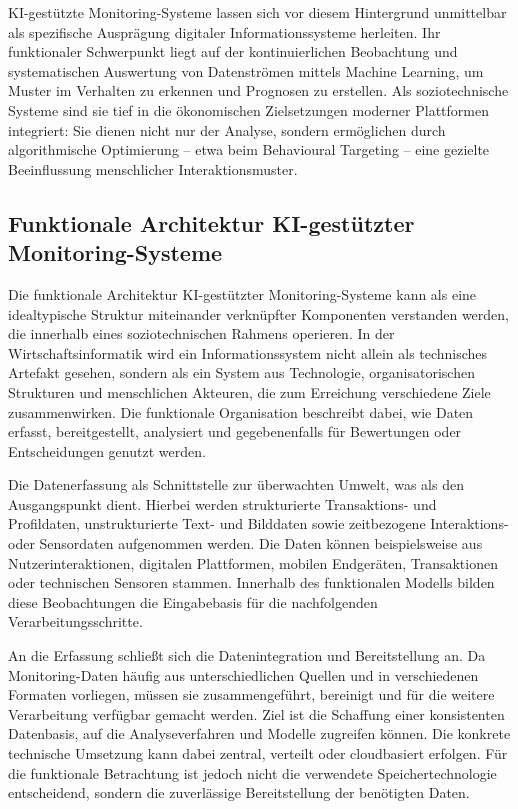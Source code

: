 KI-gestützte Monitoring-Systeme lassen sich vor diesem Hintergrund unmittelbar als spezifische Ausprägung digitaler Informationssysteme herleiten. Ihr funktionaler Schwerpunkt liegt auf der kontinuierlichen Beobachtung und systematischen Auswertung von Datenströmen mittels Machine Learning, um Muster im Verhalten zu erkennen und Prognosen zu erstellen. Als soziotechnische Systeme sind sie tief in die ökonomischen Zielsetzungen moderner Plattformen integriert: Sie dienen nicht nur der Analyse, sondern ermöglichen durch algorithmische Optimierung -- etwa beim Behavioural Targeting -- eine gezielte Beeinflussung menschlicher Interaktionsmuster.

\subsection{Funktionale Architektur KI-gestützter Monitoring-Systeme}

Die funktionale Architektur KI-gestützter Monitoring-Systeme kann als eine idealtypische Struktur miteinander verknüpfter Komponenten verstanden werden, die innerhalb eines soziotechnischen Rahmens operieren. In der Wirtschaftsinformatik wird ein Informationssystem nicht allein als technisches Artefakt gesehen, sondern als ein System aus Technologie, organisatorischen Strukturen und menschlichen Akteuren, die zum Erreichung verschiedene Ziele zusammenwirken. Die funktionale Organisation beschreibt dabei, wie Daten erfasst, bereitgestellt, analysiert und gegebenenfalls für Bewertungen oder Entscheidungen genutzt werden.

Die Datenerfassung als Schnittstelle zur überwachten Umwelt, was als den Ausgangspunkt dient. Hierbei werden strukturierte Transaktions- und Profildaten, unstrukturierte Text- und Bilddaten sowie zeitbezogene Interaktions- oder Sensordaten aufgenommen werden. Die Daten können beispielsweise aus Nutzerinteraktionen, digitalen Plattformen, mobilen Endgeräten, Transaktionen oder technischen Sensoren stammen. Innerhalb des funktionalen Modells bilden diese Beobachtungen die Eingabebasis für die nachfolgenden Verarbeitungsschritte.

An die Erfassung schließt sich die Datenintegration und Bereitstellung an. Da Monitoring-Daten häufig aus unterschiedlichen Quellen und in verschiedenen Formaten vorliegen, müssen sie zusammengeführt, bereinigt und für die weitere Verarbeitung verfügbar gemacht werden. Ziel ist die Schaffung einer konsistenten Datenbasis, auf die Analyseverfahren und Modelle zugreifen können. Die konkrete technische Umsetzung kann dabei zentral, verteilt oder cloudbasiert erfolgen. Für die funktionale Betrachtung ist jedoch nicht die verwendete Speichertechnologie entscheidend, sondern die zuverlässige Bereitstellung der benötigten Daten.

